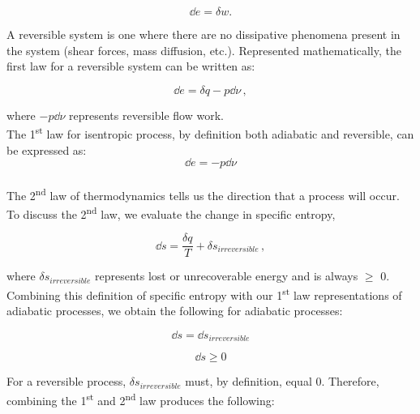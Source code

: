 \documentclass[12pt,letterpaper]{article}
\begin{document}
\begin{enumerate}[label=(\alph*)]
\begin{enumerate}[label=\arabic*.]
					\begin{equation*}
						\dd e = \delta w.
					\end{equation*}
					
					A reversible system is one where there are no dissipative phenomena present in the system (shear forces, mass diffusion, etc.). Represented mathematically, the first law for a reversible system can be written as:
					
					\begin{equation*}
						\dd e = \delta q - p\dd \nu\,,
					\end{equation*}			
						
					where $-p\dd \nu$ represents reversible flow work. \\
					
					The 1\textsuperscript{st} law for isentropic process, by definition both adiabatic and reversible, can be expressed as:
					\begin{equation*}
						\dd e = -p\dd \nu
					\end{equation*}
					\medskip
					\\
					
					The 2\textsuperscript{nd} law of thermodynamics tells us the direction that a process will occur. To discuss the 2\textsuperscript{nd} law, we evaluate the change in specific entropy,
					
					\begin{equation*}
						\dd s = \frac{\delta q}{T} + \delta s_{irreversible}\,,
					\end{equation*}
				
					
					where $\delta s_{irreversible}$ represents lost or unrecoverable energy and is always $\ge$ 0. Combining this definition of specific entropy with our 1\textsuperscript{st} law representations of adiabatic processes, we obtain the following for adiabatic processes:
					
					\begin{equation*}
						\dd s = \dd s_{irreversible}
					\end{equation*}
					
					\begin{equation*}
						\dd s \ge 0
					\end{equation*}
					
					For a reversible process, $\delta s_{irreversible}$ must, by definition, equal 0. Therefore, combining the 1\textsuperscript{st} and 2\textsuperscript{nd} law produces the following:
					

\end{enumerate}
\end{enumerate}
\end{document}
